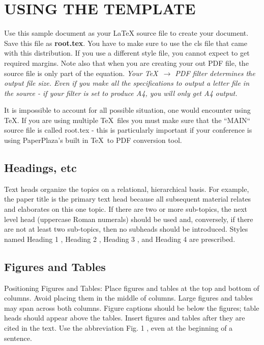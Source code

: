 \documentclass[letterpaper, 10 pt, conference]{ieeeconf}  %
\begin{document}
\section{USING THE TEMPLATE}

Use this sample document as your LaTeX source file to create your document. Save this file as {\bf root.tex}. You have to make sure to use the cls file that came with this distribution. If you use a different style file, you cannot expect to get required margins. Note also that when you are creating your out PDF file, the source file is only part of the equation. {\it Your \TeX\ $\rightarrow$ PDF filter determines the output file size. Even if you make all the specifications to output a letter file in the source - if your filter is set to produce A4, you will only get A4 output. }

It is impossible to account for all possible situation, one would encounter using \TeX. If you are using multiple \TeX\ files you must make sure that the ``MAIN`` source file is called root.tex - this is particularly important if your conference is using PaperPlaza's built in \TeX\ to PDF conversion tool.

\subsection{Headings, etc}

Text heads organize the topics on a relational, hierarchical basis. For example, the paper title is the primary text head because all subsequent material relates and elaborates on this one topic. If there are two or more sub-topics, the next level head (uppercase Roman numerals) should be used and, conversely, if there are not at least two sub-topics, then no subheads should be introduced. Styles named  Heading 1 ,  Heading 2 ,  Heading 3 , and  Heading 4  are prescribed.

\subsection{Figures and Tables}

Positioning Figures and Tables: Place figures and tables at the top and bottom of columns. Avoid placing them in the middle of columns. Large figures and tables may span across both columns. Figure captions should be below the figures; table heads should appear above the tables. Insert figures and tables after they are cited in the text. Use the abbreviation  Fig. 1 , even at the beginning of a sentence.
\end{document}
